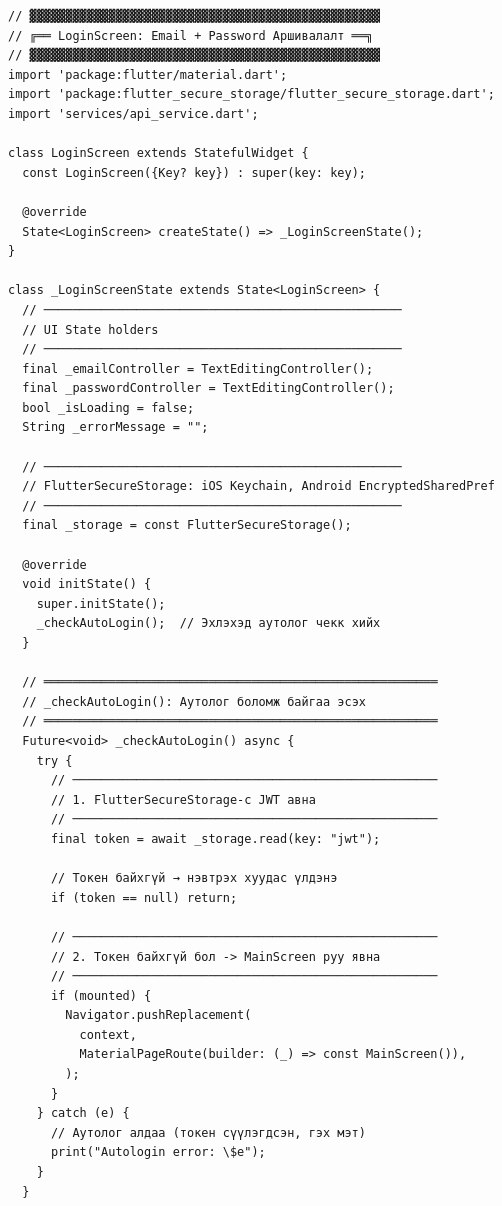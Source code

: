 \begin{lstlisting}[caption={login\_screen.dart -- JWT токены ашиглан нэвтэрх}]
// ▓▓▓▓▓▓▓▓▓▓▓▓▓▓▓▓▓▓▓▓▓▓▓▓▓▓▓▓▓▓▓▓▓▓▓▓▓▓▓▓▓▓▓▓▓▓▓▓▓
// ╔══ LoginScreen: Email + Password Аршивалалт ══╗
// ▓▓▓▓▓▓▓▓▓▓▓▓▓▓▓▓▓▓▓▓▓▓▓▓▓▓▓▓▓▓▓▓▓▓▓▓▓▓▓▓▓▓▓▓▓▓▓▓▓
import 'package:flutter/material.dart';
import 'package:flutter_secure_storage/flutter_secure_storage.dart';
import 'services/api_service.dart';

class LoginScreen extends StatefulWidget {
  const LoginScreen({Key? key}) : super(key: key);

  @override
  State<LoginScreen> createState() => _LoginScreenState();
}

class _LoginScreenState extends State<LoginScreen> {
  // ──────────────────────────────────────────────────
  // UI State holders
  // ──────────────────────────────────────────────────
  final _emailController = TextEditingController();
  final _passwordController = TextEditingController();
  bool _isLoading = false;
  String _errorMessage = "";

  // ──────────────────────────────────────────────────
  // FlutterSecureStorage: iOS Keychain, Android EncryptedSharedPref
  // ──────────────────────────────────────────────────
  final _storage = const FlutterSecureStorage();

  @override
  void initState() {
    super.initState();
    _checkAutoLogin();  // Эхлэхэд аутолог чекк хийх
  }

  // ═══════════════════════════════════════════════════════
  // _checkAutoLogin(): Аутолог боломж байгаа эсэх
  // ═══════════════════════════════════════════════════════
  Future<void> _checkAutoLogin() async {
    try {
      // ───────────────────────────────────────────────────
      // 1. FlutterSecureStorage-с JWT авна
      // ───────────────────────────────────────────────────
      final token = await _storage.read(key: "jwt");

      // Токен байхгүй → нэвтрэх хуудас үлдэнэ
      if (token == null) return;

      // ───────────────────────────────────────────────────
      // 2. Токен байхгүй бол -> MainScreen руу явна
      // ───────────────────────────────────────────────────
      if (mounted) {
        Navigator.pushReplacement(
          context,
          MaterialPageRoute(builder: (_) => const MainScreen()),
        );
      }
    } catch (e) {
      // Аутолог алдаа (токен сүүлэгдсэн, гэх мэт)
      print("Autologin error: \$e");
    }
  }


\end{lstlisting}

